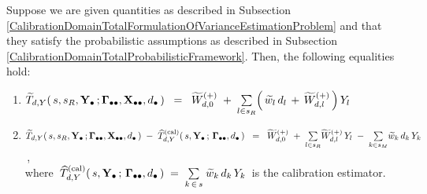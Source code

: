 \vskip 0.1cm
\begin{lemma}
\label{CalibrationDomainTotalImputationError}
\mbox{}
\vskip 0.1cm
\noindent
Suppose we are given quantities as described in Subsection
\ref{CalibrationDomainTotalFormulationOfVarianceEstimationProblem}
and
that they satisfy the probabilistic assumptions as described in Subsection
\ref{CalibrationDomainTotalProbabilisticFramework}.
\vskip 0.1cm
\noindent
Then, the following equalities hold:
\renewcommand{\theenumi}{\roman{enumi}}
\renewcommand{\labelenumi}{\mbox{}\;\;\,(\theenumi)$\quad$}
\begin{enumerate}
\item
    $
    \widetilde{T}_{d,Y}(\,s,s_{R},\mathbf{Y}_{\bullet}\,;\mathbf{\Gamma}_{\bullet\bullet},\mathbf{X}_{\bullet\bullet},d_{\bullet}\,)
    \;\; = \;\;
        \widetilde{W}^{(+)}_{d,0}
        \;+\;
        \underset{l \in s_{R}}{\sum}\!\left(\,
            \widetilde{w}_{l}\,d_{l}
            \, + \,
            \widetilde{W}^{(+)}_{d,l}
            \,\right)Y_{l}
    $
\item
    $
    \widetilde{T}_{d,Y}(\,s,s_{R},\mathbf{Y}_{\bullet}\,;\mathbf{\Gamma}_{\bullet\bullet},\mathbf{X}_{\bullet\bullet},d_{\bullet}\,)
    \;-\;
    \widehat{T}^{\textnormal{(cal)}}_{d,Y}(\,s,\mathbf{Y}_{\bullet}\,;\,\mathbf{\Gamma}_{\bullet\bullet},d_{\bullet}\,)
    \;\; = \;\;
        \widetilde{W}^{(+)}_{d,0}
        \;+\;
        \underset{l \in s_{R}}{\sum}\widetilde{W}^{(+)}_{d,l}\,Y_{l}
        \;-\;
        \underset{k \in s_{M}}{\sum}\widetilde{w}_{k}\,d_{k}\,Y_{k}
    $\,,\\
    where
    \,$
    \widehat{T}^{\textnormal{(cal)}}_{d,Y}(\,s,\mathbf{Y}_{\bullet}\,;\,\mathbf{\Gamma}_{\bullet\bullet},d_{\bullet}\,)
    \; = \;
        \underset{k\,\in\,s}{\sum}\;\widetilde{w}_{k}\,d_{k}\,Y_{k}
    $\,
    is the calibration estimator.
\end{enumerate}
\end{lemma}
\proof
